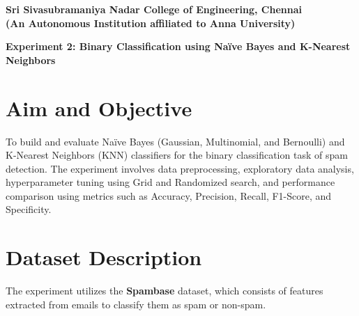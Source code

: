 \documentclass[11pt]{article}
\begin{document}
\begin{center}
    {\Large\bfseries Sri Sivasubramaniya Nadar College of Engineering, Chennai}\\[0.3em]
    {\bfseries (An Autonomous Institution affiliated to Anna University)}
\end{center}


\begin{table}[h]
\renewcommand{\arraystretch}{1.4}
\end{table}

\begin{center}
    {\Large\bfseries Experiment 2: Binary Classification using Naïve Bayes and K-Nearest Neighbors}
\end{center}



\section{Aim and Objective}
To build and evaluate Naïve Bayes (Gaussian, Multinomial, and Bernoulli) and K-Nearest Neighbors (KNN) classifiers for the binary classification task of spam detection. The experiment involves data preprocessing, exploratory data analysis, hyperparameter tuning using Grid and Randomized search, and performance comparison using metrics such as Accuracy, Precision, Recall, F1-Score, and Specificity.

\section{Dataset Description}
The experiment utilizes the \textbf{Spambase} dataset, which consists of features extracted from emails to classify them as spam or non-spam.
\end{document}
